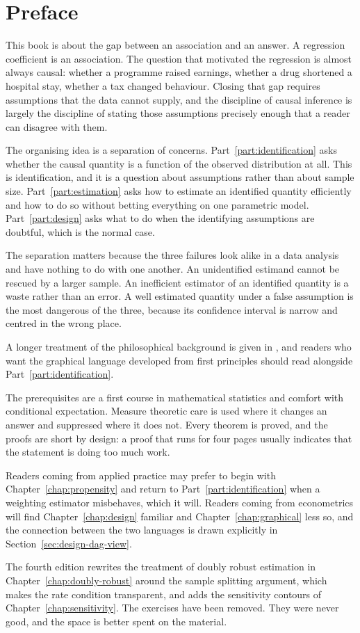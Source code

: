 \chapter*{Preface}

This book is about the gap between an association and an answer. A regression
coefficient is an association. The question that motivated the regression is
almost always causal: whether a programme raised earnings, whether a drug
shortened a hospital stay, whether a tax changed behaviour. Closing that gap
requires assumptions that the data cannot supply, and the discipline of causal
inference is largely the discipline of stating those assumptions precisely
enough that a reader can disagree with them.

The organising idea is a separation of concerns. Part~\ref{part:identification}
asks whether the causal quantity is a function of the observed distribution at
all. This is identification, and it is a question about assumptions rather than
about sample size. Part~\ref{part:estimation} asks how to estimate an identified
quantity efficiently and how to do so without betting everything on one
parametric model. Part~\ref{part:design} asks what to do when the identifying
assumptions are doubtful, which is the normal case.

The separation matters because the three failures look alike in a data analysis
and have nothing to do with one another. An unidentified estimand cannot be
rescued by a larger sample. An inefficient estimator of an identified quantity
is a waste rather than an error. A well estimated quantity under a false
assumption is the most dangerous of the three, because its confidence interval
is narrow and centred in the wrong place.

A longer treatment of the philosophical background is given in
\citet{achterberg2018foundations}, and readers who want the graphical language
developed from first principles should read \citet{ferreiro2007graphs}
alongside Part~\ref{part:identification}.

The prerequisites are a first course in mathematical statistics and comfort with
conditional expectation. Measure theoretic care is used where it changes an
answer and suppressed where it does not. Every theorem is proved, and the proofs
are short by design: a proof that runs for four pages usually indicates that the
statement is doing too much work.

Readers coming from applied practice may prefer to begin with
Chapter~\ref{chap:propensity} and return to Part~\ref{part:identification} when
a weighting estimator misbehaves, which it will. Readers coming from
econometrics will find Chapter~\ref{chap:design} familiar and
Chapter~\ref{chap:graphical} less so, and the connection between the two
languages is drawn explicitly in Section~\ref{sec:design-dag-view}.

The fourth edition rewrites the treatment of doubly robust estimation in
Chapter~\ref{chap:doubly-robust} around the sample splitting argument, which
makes the rate condition transparent, and adds the sensitivity contours of
Chapter~\ref{chap:sensitivity}. The exercises have been removed. They were never
good, and the space is better spent on the material.
